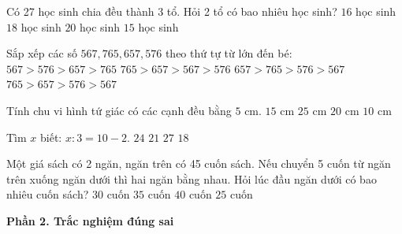 \begin{ex} %
Có 27 học sinh chia đều thành 3 tổ. Hỏi 2 tổ có bao nhiêu học sinh?
\choice
{$16$ học sinh}
{\True $18$ học sinh}
{$20$ học sinh}
{$15$ học sinh}
\end{ex}

\begin{ex} %
Sắp xếp các số $567, 765, 657, 576$ theo thứ tự từ lớn đến bé:
\choice
{$567 > 576 > 657 > 765$}
{$765 > 657 > 567 > 576$}
{$657 > 765 > 576 > 567$}
{\True $765 > 657 > 576 > 567$}
\end{ex}

\begin{ex} %
Tính chu vi hình tứ giác có các cạnh đều bằng $5\text{ cm}$.
\choice
{$15\text{ cm}$}
{$25\text{ cm}$}
{\True $20\text{ cm}$}
{$10\text{ cm}$}
\end{ex}

\begin{ex} %
Tìm $x$ biết: $x : 3 = 10 - 2$.
\choice
{\True $24$}
{$21$}
{$27$}
{$18$}
\end{ex}

\begin{ex} %
Một giá sách có 2 ngăn, ngăn trên có 45 cuốn sách. Nếu chuyển 5 cuốn từ ngăn trên xuống ngăn dưới thì hai ngăn bằng nhau. Hỏi lúc đầu ngăn dưới có bao nhiêu cuốn sách?
\choice
{$30$ cuốn}
{\True $35$ cuốn}
{$40$ cuốn}
{$25$ cuốn}
\end{ex}

\textbf{Phần 2. Trắc nghiệm đúng sai}

